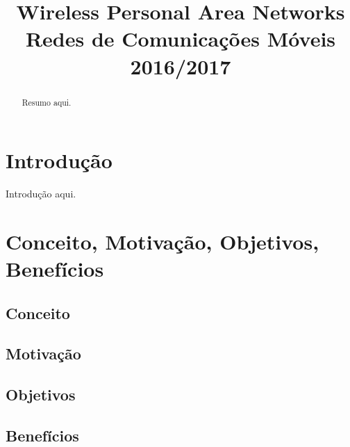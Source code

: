 \documentclass[conference]{IEEEtran}
\begin{document}
\title{Wireless Personal Area Networks\\
  \large Redes de Comunicações Móveis\\
  2016/2017
}

\author{
\and
{}
}

\maketitle

\begin{abstract}
Resumo aqui.
\end{abstract}


\IEEEpeerreviewmaketitle


\section{Introdução}
Introdução aqui.

\section{Conceito, Motivação, Objetivos, Benefícios}

\subsection{Conceito}

\subsection{Motivação}

\subsection{Objetivos}

\subsection{Benefícios}
\end{document}
